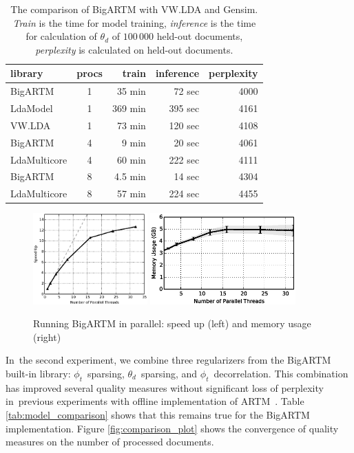 \documentclass[russian,english]{llncs}
\begin{document}
\begin{table}[t]
	\caption{
        The comparison of BigARTM with VW.LDA and Gensim.
        \emph{Train} is the time for model training,
        \emph{inference} is the time for calculation of $\theta_d$ of $100\,000$ held-out documents,
        \emph{perplexity} is calculated on held-out documents.
    }
	\label{tab:libraries_comparison}
    \centering\tabcolsep=4.3pt
	\begin{tabular}[t]{l|c|rrr}
	\hline
	library & procs & train & inference & perplexity \\
	\hline
	BigARTM & 1 & 35 min & 72 sec & 4000 \\
	LdaModel & 1 & 369 min & 395 sec & 4161  \\
	VW.LDA & 1 & 73 min & 120 sec & 4108 \\
	\hline
	BigARTM & 4 & 9 min & 20 sec & 4061  \\
	LdaMulticore & 4 & 60 min & 222 sec & 4111  \\	
	\hline
	BigARTM & 8 & 4.5 min & 14 sec & 4304  \\
	LdaMulticore & 8 & 57 min & 224 sec & 4455 \\
	\hline
	\end{tabular}
\end{table}

\begin{figure}[t]
	\centering
	\includegraphics[height=35mm]{bigartm_speedup.eps}
	\includegraphics[height=35mm]{bigartm_memory.eps}
	\caption{Running BigARTM in parallel: speed up (left) and memory usage (right)}
	\label{fig:bigartm_speedup}
\end{figure}

In~the second experiment, 
we combine three regularizers from the BigARTM built-in library:
$\phi_{t}$~sparsing,
$\theta_{d}$~sparsing, and
$\phi_{t}$~decorrelation.
This combination has improved several quality measures without significant loss of perplexity
in~previous experiments with offline implementation of ARTM~\cite{voron14aist}.
Table \ref{tab:model_comparison} shows that this remains true for the BigARTM implementation.
Figure \ref{fig:comparison_plot} shows the convergence of quality measures on the number of processed documents.
\end{document}
